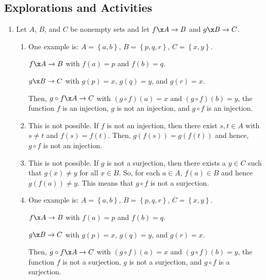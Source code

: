 \subsection*{Explorations and Activities}
\setcounter{oldenumi}{\theenumi}
\begin{enumerate} \setcounter{enumi}{\theoldenumi}
\item Let  $A$, $B$, and  $C$  be nonempty sets and let  $f\x A \to B$  and  $g\x B \to C$.

\begin{enumerate} 
\item One example is:  $A = \left\{ {a, b} \right\}$, $B = \left\{ {p, q, r} \right\}$, 
$C = \left\{ {x, y} \right\}$.

$f\x A \to B$  with  $f\left( a \right) = p$ and  $f\left( b \right) = q$.

$g\x B \to C$ with  $g\left( p \right) = x$, $g\left( q \right) = y$, and  $g\left( r \right) = x$. 

Then,
$g \circ f\x A \to C$  with  $\left( {g \circ f} \right)\left( a \right) = x$  and   
$\left( {g \circ f} \right)\left( b \right) = y$, the function  $f$  is an injection,  $g$  is not an injection, and  $g \circ f$ is an injection.

\item This is not possible.  If  $f$  is not an injection, then there exist  $s, t \in A$ with  
$s \ne t$  and  $f\left( s \right) = f\left( t \right)$.  Then,  
$g\left( {f\left( s \right)} \right) = g\left( {f\left( t \right)} \right)$ and hence, $g \circ f$
is not an injection.

\item This is not possible.  If  $g$  is not a surjection, then there exists a  $y \in C$ such that  $g\left( x \right) \ne y$ for all  $x \in B$.  So, for each  $a \in A$,  
$f\left( a \right) \in B$ and hence  $g\left( {f\left( a \right)} \right) \ne y$.  This means that  $g \circ f$ is not a surjection.

\item One example is:  $A = \left\{ {a, b} \right\}$, $B = \left\{ {p, q, r} \right\}$, 
$C = \left\{ {x, y} \right\}$.

$f\x A \to B$  with  $f\left( a \right) = p$ and  $f\left( b \right) = q$.

$g\x B \to C$ with  $g\left( p \right) = x$, $g\left( q \right) = y$, and  $g\left( r \right) = x$. 

Then, $g \circ f\x A \to C$  with  $\left( {g \circ f} \right)\left( a \right) = x$  and   
$\left( {g \circ f} \right)\left( b \right) = y$, the function  $f$  is not a surjection,  $g$  is not a surjection, and  $g \circ f$ is a surjection.


\end{enumerate}
\end{enumerate}

